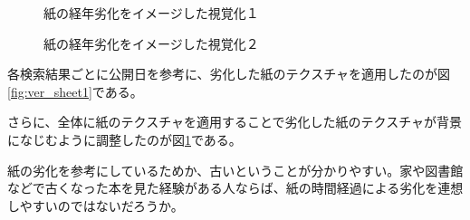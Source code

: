 \begin{figure}[htbp]
  \begin{minipage}{0.5\hsize}
    \begin{center}
    \end{center}
    \caption{紙の経年劣化をイメージした視覚化１}
    \label{fig:ver_sheet1}
  \end{minipage}
  \begin{minipage}{0.5\hsize}
    \begin{center}
    \end{center}
    \caption{紙の経年劣化をイメージした視覚化２}
    \label{fig:ver_sheet2}
  \end{minipage}
\end{figure}

各検索結果ごとに公開日を参考に、劣化した紙のテクスチャを適用したのが図\ref{fig:ver_sheet1}である。

さらに、全体に紙のテクスチャを適用することで劣化した紙のテクスチャが背景になじむように調整したのが図\ref{fig:ver_sheet2}である。

紙の劣化を参考にしているためか、古いということが分かりやすい。家や図書館などで古くなった本を見た経験がある人ならば、紙の時間経過による劣化を連想しやすいのではないだろうか。

